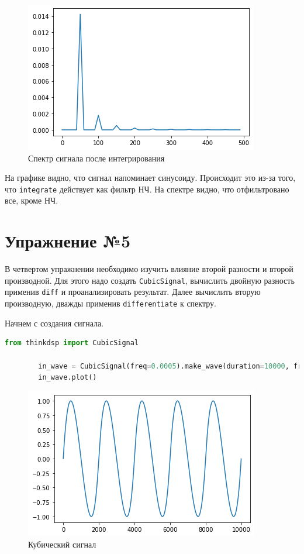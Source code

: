 \documentclass[a4paper, 14pt]{extarticle}
\begin{document}
    \begin{figure}[H]
        \centering
        \includegraphics[width=0.8\linewidth]{sawtooth_integrate_spectrum}
        \caption{Спектр сигнала после интегрирования}
        \label{fig:sawtooth_integrate_spectrum}
    \end{figure}

    На графике видно, что сигнал напоминает синусоиду.
    Происходит это из-за того, что \texttt{integrate} действует как фильтр НЧ.
    На спектре видно, что отфильтровано все, кроме НЧ.

    \newpage


    \section{Упражнение №5}
    \label{sec:5}

    В четвертом упражнении необходимо изучить влияние второй разности и второй производной.
    Для этого надо создать \texttt{CubicSignal}, вычислить двойную разность применив \texttt{diff} и проанализировать результат.
    Далее вычислить вторую производную, дважды применив \texttt{differentiate} к спектру.

    Начнем с создания сигнала.

    \begin{lstlisting}[language=Python, caption= Создание кубического сигнала, label={lst:make_cubic_signal}]
        from thinkdsp import CubicSignal

        in_wave = CubicSignal(freq=0.0005).make_wave(duration=10000, framerate=1)
        in_wave.plot()
    \end{lstlisting}

    \begin{figure}[H]
        \centering
        \includegraphics[width=0.8\linewidth]{cubic_signal}
        \caption{Кубический сигнал}
        \label{fig:cubic_signal}
    \end{figure}
\end{document}
